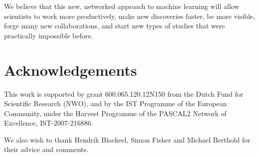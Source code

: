 \documentclass{acmproc-sp}
\begin{document}
We believe that this new, networked approach to machine learning will allow scientists to work more productively, make new discoveries faster, be more visible, forge many new collaborations, and start new types of studies that were practically impossible before. 

\section{Acknowledgements}
This work is supported by grant 600.065.120.12N150 from the Dutch Fund for Scientific Research (NWO), and by the IST Programme of the European Community, under the Harvest Programme of the PASCAL2 Network of Excellence, IST-2007-216886.

We also wish to thank Hendrik Blockeel, Simon Fisher and Michael Berthold for their advice and comments.


%
\end{document}
